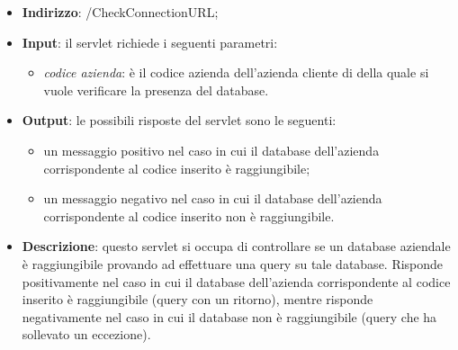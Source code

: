 \begin{itemize}
	\item \textbf{Indirizzo}: /CheckConnectionURL;
	\item \textbf{Input}: il servlet richiede i seguenti parametri:
		\begin{itemize}
			\item \textit{codice azienda}: è il codice azienda dell'azienda cliente di \visione{} della quale si vuole verificare la presenza del database.
		\end{itemize}
	\item \textbf{Output}: le possibili risposte del servlet sono le seguenti:
		\begin{itemize}
			\item un messaggio positivo nel caso in cui il database dell'azienda corrispondente al codice inserito è raggiungibile;
			\item un messaggio negativo nel caso in cui il database dell'azienda corrispondente al codice inserito non è raggiungibile.
		\end{itemize}
	\item \textbf{Descrizione}: questo servlet si occupa di controllare se un database aziendale è raggiungibile provando ad effettuare una query su tale database. Risponde positivamente nel caso in cui il database dell'azienda corrispondente al codice inserito è raggiungibile (query con un ritorno), mentre risponde negativamente nel caso in cui il database non è raggiungibile (query che ha sollevato un eccezione).
\end{itemize}


